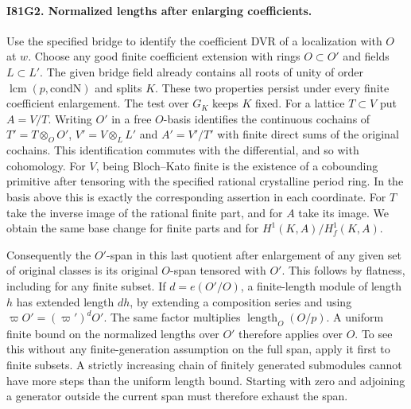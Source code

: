 \paragraph{I81G2. Normalized lengths after enlarging coefficients.}
Use the specified bridge to identify the coefficient DVR of a
localization with $O$ at $w$. Choose any good finite coefficient
extension with rings $O\subset O'$ and fields $L\subset L'$.
The given bridge field already contains all roots of unity of order
$\operatorname{lcm}(p,\mathrm{condN})$ and splits $K$. These two
properties persist under every finite coefficient enlargement. The test over
$G_K$ keeps $K$ fixed. For a lattice $T\subset V$ put $A=V/T$.
Writing $O'$ in a free $O$-basis identifies the continuous cochains
of $T'=T\otimes_O O'$, $V'=V\otimes_L L'$ and $A'=V'/T'$
with finite direct sums of the original cochains. This identification
commutes with the differential, and so with cohomology. For $V$,
being Bloch--Kato finite is the existence of a cobounding primitive
after tensoring with the specified rational crystalline period ring.
In the basis above this is exactly the corresponding assertion in
each coordinate. For $T$ take the inverse image of the rational finite
part, and for $A$ take its image. We obtain the same base change
for finite parts and for $H^1(K,A)/H_f^1(K,A)$.

Consequently the $O'$-span in this last quotient after enlargement
of any given set of original classes is its original $O$-span
tensored with $O'$. This follows by flatness, including for any
finite subset. If $d=e(O'/O)$, a finite-length module of length
$h$ has extended length $dh$, by extending a composition series
and using $\varpi O'=(\varpi')^d O'$. The same factor multiplies
$\operatorname{length}_O(O/p)$. A uniform finite bound on the
normalized lengths over $O'$ therefore applies over $O$. To see
this without any finite-generation assumption on the full span,
apply it first to finite subsets. A strictly increasing chain of
finitely generated submodules cannot have more steps than the
uniform length bound. Starting with zero and adjoining a generator
outside the current span must therefore exhaust the span.

